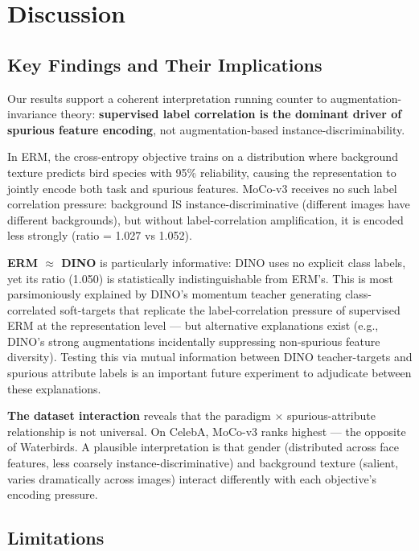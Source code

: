 \section{Discussion}
\label{sec:discussion}

\subsection{Key Findings and Their Implications}

Our results support a coherent interpretation running counter to augmentation-invariance theory: \textbf{supervised label correlation is the dominant driver of spurious feature encoding}, not augmentation-based instance-discriminability.

In ERM, the cross-entropy objective trains on a distribution where background texture predicts bird species with 95\% reliability, causing the representation to jointly encode both task and spurious features. MoCo-v3 receives no such label correlation pressure: background IS instance-discriminative (different images have different backgrounds), but without label-correlation amplification, it is encoded less strongly (ratio = 1.027 vs 1.052).

\textbf{ERM $\approx$ DINO} is particularly informative: DINO uses no explicit class labels, yet its ratio (1.050) is statistically indistinguishable from ERM's. This is most parsimoniously explained by DINO's momentum teacher generating class-correlated soft-targets that replicate the label-correlation pressure of supervised ERM at the representation level --- but alternative explanations exist (e.g., DINO's strong augmentations incidentally suppressing non-spurious feature diversity). Testing this via mutual information between DINO teacher-targets and spurious attribute labels is an important future experiment to adjudicate between these explanations.

\textbf{The dataset interaction} reveals that the paradigm $\times$ spurious-attribute relationship is not universal. On CelebA, MoCo-v3 ranks highest --- the opposite of Waterbirds. A plausible interpretation is that gender (distributed across face features, less coarsely instance-discriminative) and background texture (salient, varies dramatically across images) interact differently with each objective's encoding pressure.

\subsection{Limitations}

